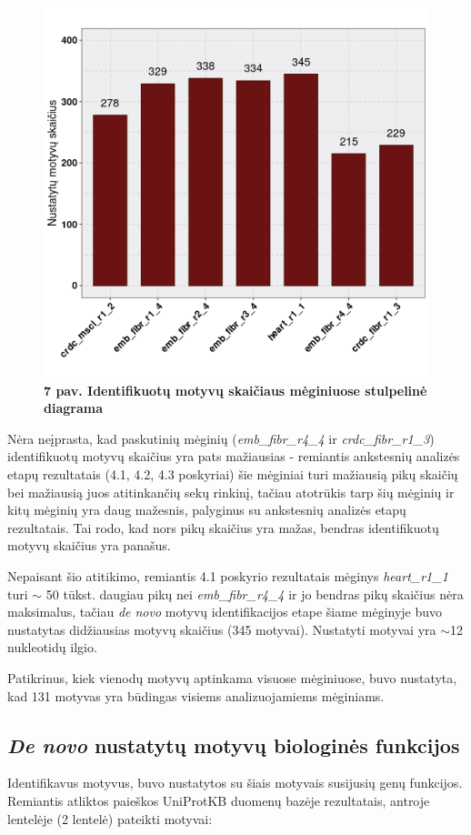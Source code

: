 \documentclass[12pt]{article}
\begin{document}
\begin{figure}[htb]
    \begin{center}
        \includegraphics[width=0.6\linewidth]{../Figures/motifs_in_samples.png}
        \vspace{-2\baselineskip}
        \caption*{\small\textbf{7 pav. Identifikuotų motyvų skaičiaus
                                mėginiuose stulpelinė diagrama}}
    \end{center}
\end{figure}

Nėra neįprasta, kad paskutinių mėginių (\small\emph{emb\_fibr\_r4\_4} ir
\small\emph{crdc\_fibr\_r1\_3}) identifikuotų motyvų skaičius yra pats
mažiausias - remiantis ankstesnių analizės etapų rezultatais (4.1, 4.2, 4.3
poskyriai) šie mėginiai turi mažiausią pikų skaičių bei mažiausią juos
atitinkančių sekų rinkinį, tačiau atotrūkis tarp šių mėginių ir kitų mėginių
yra daug mažesnis, palyginus su ankstesnių analizės etapų rezultatais.
Tai rodo, kad nors pikų skaičius yra mažas, bendras identifikuotų motyvų
skaičius yra panašus.

Nepaisant šio atitikimo, remiantis 4.1 poskyrio rezultatais mėginys
\small\emph{heart\_r1\_1} turi \(\sim\) 50 tūkst. daugiau pikų nei
\small\emph{emb\_fibr\_r4\_4} ir jo bendras pikų skaičius nėra maksimalus,
tačiau \emph{de novo} motyvų identifikacijos etape šiame mėginyje buvo
nustatytas didžiausias motyvų skaičius (345 motyvai). Nustatyti motyvai yra
\(\sim\)12 nukleotidų ilgio.

Patikrinus, kiek vienodų motyvų aptinkama visuose mėginiuose, buvo nustatyta,
kad 131 motyvas yra būdingas visiems analizuojamiems mėginiams.

\newpage

\subsection{\emph{De novo} nustatytų motyvų biologinės funkcijos}
Identifikavus motyvus, buvo nustatytos su šiais motyvais susijusių genų
funkcijos. Remiantis atliktos paieškos UniProtKB\cite{UNIPROTKB} duomenų
bazėje rezultatais, antroje lentelėje (2 lentelė) pateikti motyvai:
\end{document}
